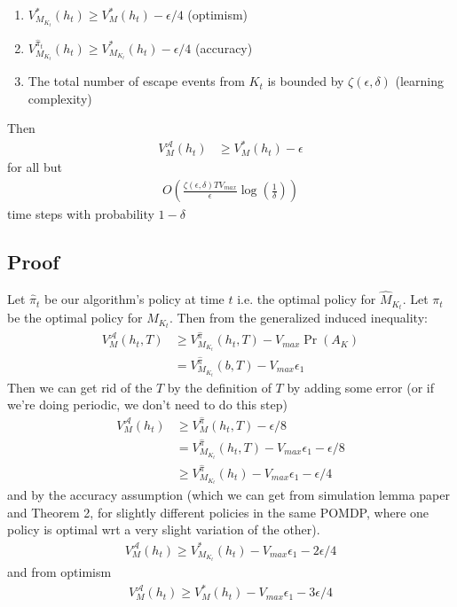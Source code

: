 \documentclass[10pt,english]{article}
\begin{document}
\begin{enumerate}
\item $V^{*}_{M_{K_t}}(h_t) \geq V^{*}_M(h_t) - \epsilon/4$ (optimism)
\item $V^{\widehat{\pi}_t}_{M_{K_t}}(h_t) \geq V^{*}_{M_{K_t}}(h_t) -\epsilon/4$ (accuracy)
\item The total number of escape events from $K_t$ is bounded by $\zeta(\epsilon,\delta)$ (learning complexity)
\end{enumerate}

Then
\begin{align}
V^\mathcal{A}_{M}(h_t) &\geq V^{*}_{M}(h_t) - \epsilon
\end{align}
for all but
\begin{align}
O\left(\frac{\zeta(\epsilon,\delta)TV_{max}}{\epsilon}\log\left(\frac{1}{\delta}\right)\right)
\end{align}
time steps with probability $1-\delta$

\subsection{Proof}

Let $\widehat{\pi}_t$ be our algorithm's policy at time $t$ i.e. the optimal policy for $\widehat{M}_{K_t}$. Let $\pi_t$ be the optimal policy for $M_{K_t}$. Then from the generalized induced inequality:
\begin{align}
V^{\mathcal{A}}_M(h_t,T) &\geq V^{\widehat{\pi}}_{M_{K_t}}(h_t,T) - V_{max}\Pr(A_K)\\
&= V^{\widehat{\pi}}_{M_{K_t}}(b,T) - V_{max}\epsilon_1
\end{align}
Then we can get rid of the $T$ by the definition of $T$ by adding some error (or if we're doing periodic, we don't need to do this step)
\begin{align}
V^{\mathcal{A}}_M(h_t) &\geq V^{\widehat{\pi}}_M(h_t,T) - \epsilon/8\\
&= V^{\widehat{\pi}}_{M_{K_t}}(h_t,T) - V_{max}\epsilon_1 - \epsilon/8 \\
&\geq V^{\widehat{\pi}}_{M_{K_t}}(h_t) - V_{max}\epsilon_1 - \epsilon/4
\end{align}
and by the accuracy assumption (which we can get from simulation lemma paper and Theorem 2, for slightly different policies in the same POMDP, where one policy is optimal wrt a very slight variation of the other).
\begin{align}
V^{\mathcal{A}}_M(h_t) \geq V^{*}_{M_{K_t}}(h_t) - V_{max}\epsilon_1 - 2\epsilon/4
\end{align}
and from optimism
\begin{align}
V^{\mathcal{A}}_M(h_t) \geq V^{*}_{M}(h_t) - V_{max}\epsilon_1 - 3\epsilon/4
\end{align}
\end{document}
